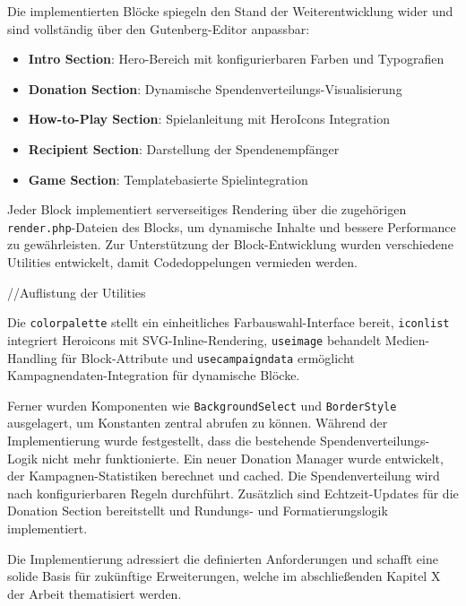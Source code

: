 Die implementierten Blöcke spiegeln den Stand der Weiterentwicklung wider und sind vollständig über den Gutenberg-Editor anpassbar:

\begin{itemize}
    \item \textbf{Intro Section}: Hero-Bereich mit konfigurierbaren Farben und Typografien
    \item \textbf{Donation Section}: Dynamische Spendenverteilungs-Visualisierung
    \item \textbf{How-to-Play Section}: Spielanleitung mit HeroIcons Integration
    \item \textbf{Recipient Section}: Darstellung der Spendenempfänger
    \item \textbf{Game Section}: Templatebasierte Spielintegration
\end{itemize}

Jeder Block implementiert serverseitiges Rendering über die zugehörigen \texttt{render.php}-Dateien des Blocks, um dynamische Inhalte und bessere Performance zu gewährleisten.
Zur Unterstützung der Block-Entwicklung wurden verschiedene Utilities entwickelt, damit Codedoppelungen vermieden werden.


//Auflistung der Utilities

Die \texttt{colorpalette} stellt ein einheitliches Farbauswahl-Interface bereit, \texttt{iconlist} integriert Heroicons mit SVG-Inline-Rendering, \texttt{useimage} behandelt Medien-Handling für Block-Attribute und \texttt{usecampaigndata} ermöglicht Kampagnendaten-Integration für dynamische Blöcke.

Ferner wurden Komponenten wie \texttt{BackgroundSelect} und \texttt{BorderStyle} ausgelagert, um Konstanten zentral abrufen zu können.
Während der Implementierung wurde festgestellt, dass die bestehende Spendenverteilungs-Logik nicht mehr funktionierte.
Ein neuer Donation Manager wurde entwickelt, der Kampagnen-Statistiken berechnet und cached.
Die Spendenverteilung wird nach konfigurierbaren Regeln durchführt.
Zusätzlich sind Echtzeit-Updates für die Donation Section bereitstellt und Rundungs- und Formatierungslogik implementiert.

Die Implementierung adressiert die definierten Anforderungen und schafft eine solide Basis für zukünftige Erweiterungen, welche im abschließenden Kapitel X der Arbeit thematisiert werden.
